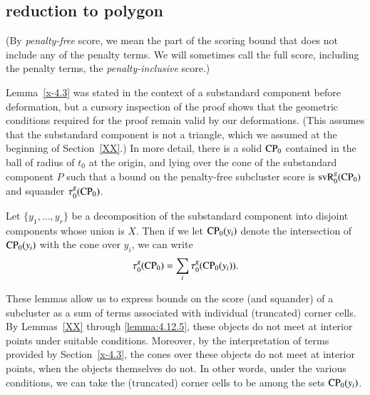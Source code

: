 \subsection{reduction to polygon} %





\begin{definition}
(By {\it penalty-free\/} score, we mean the part of the scoring
bound that does not include any of the penalty terms.  We will
sometimes call the full score, including the penalty terms, the
{\it penalty-inclusive\/} score.)
\end{definition}

Lemma~\ref{x-4.3} was stated in the context of a substandard component before
deformation, but a cursory inspection of the proof shows that the
geometric conditions required for the proof remain valid by our
deformations. (This assumes that the substandard component is not a triangle, which
we assumed at the beginning of Section~\ref{XX}.) In more detail,
there is a solid ${\operatorname{CP}}_0$ contained in the ball of radius of $t_0$ at the
origin, and lying over the cone of the substandard component $P$ such that a bound
on the penalty-free subcluster score is 
${\operatorname{svR}}^g_0({\operatorname{CP}}_0)$ and squander $\tau^g_0({\operatorname{CP}}_0)$.

Let $\{y_1,\ldots,y_r\}$ be a decomposition of the substandard component into
disjoint components whose union is $X$. Then if we let ${\operatorname{CP}}_0(y_i)$ denote
the intersection of ${\operatorname{CP}}_0(y_i)$ with the cone over $y_i$, we can write
    $$\tau^g_0({\operatorname{CP}}_0) =\sum_i \tau^g_0({\operatorname{CP}}_0(y_i)).$$

These lemmas allow us to express bounds on the score (and
squander) of a subcluster as a sum of terms associated with
individual (truncated) corner cells. By Lemmas~\ref{XX} %
through \ref{lemma:4.12.5}, these objects do not meet at interior
points under suitable conditions. Moreover, by the interpretation
of terms provided by Section~\ref{x-4.3}, the cones over these
objects do not meet at interior points, when the objects
themselves do not. In other words, under the various conditions,
we can take the (truncated) corner cells to be among the sets
${\operatorname{CP}}_0(y_i)$.

